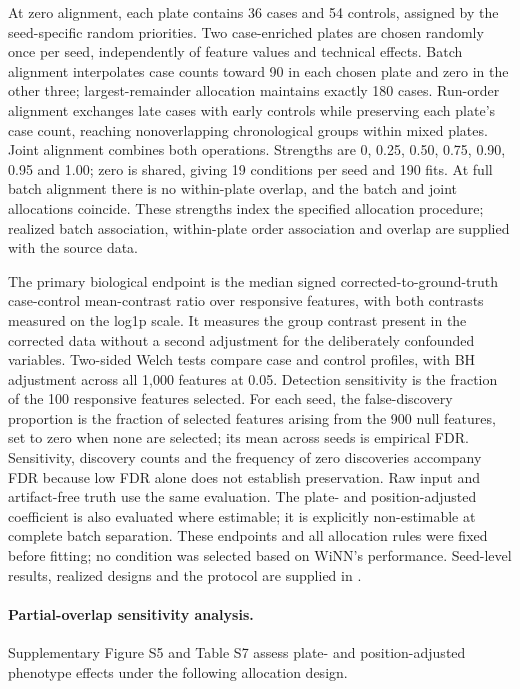\documentclass[namedate,webpdf,modern,large,nocrop]{oup-authoring-template}
\begin{document}
At zero alignment, each plate contains 36 cases and 54 controls, assigned by the seed-specific random priorities. Two case-enriched plates are chosen randomly once per seed, independently of feature values and technical effects. Batch alignment interpolates case counts toward 90 in each chosen plate and zero in the other three; largest-remainder allocation maintains exactly 180 cases. Run-order alignment exchanges late cases with early controls while preserving each plate's case count, reaching nonoverlapping chronological groups within mixed plates. Joint alignment combines both operations. Strengths are 0, 0.25, 0.50, 0.75, 0.90, 0.95 and 1.00; zero is shared, giving 19 conditions per seed and 190 fits. At full batch alignment there is no within-plate overlap, and the batch and joint allocations coincide. These strengths index the specified allocation procedure; realized batch association, within-plate order association and overlap are supplied with the source data.

The primary biological endpoint is the median signed corrected-to-ground-truth case-control mean-contrast ratio over responsive features, with both contrasts measured on the log1p scale. It measures the group contrast present in the corrected data without a second adjustment for the deliberately confounded variables. Two-sided Welch tests compare case and control profiles, with BH adjustment across all 1,000 features at 0.05. Detection sensitivity is the fraction of the 100 responsive features selected. For each seed, the false-discovery proportion is the fraction of selected features arising from the 900 null features, set to zero when none are selected; its mean across seeds is empirical FDR. Sensitivity, discovery counts and the frequency of zero discoveries accompany FDR because low FDR alone does not establish preservation. Raw input and artifact-free truth use the same evaluation. The plate- and position-adjusted coefficient is also evaluated where estimable; it is explicitly non-estimable at complete batch separation. These endpoints and all allocation rules were fixed before fitting; no condition was selected based on WiNN's performance. Seed-level results, realized designs and the protocol are supplied in .

\paragraph{Partial-overlap sensitivity analysis.} Supplementary Figure S5 and Table S7 assess plate- and position-adjusted phenotype effects under the following allocation design.
\end{document}
